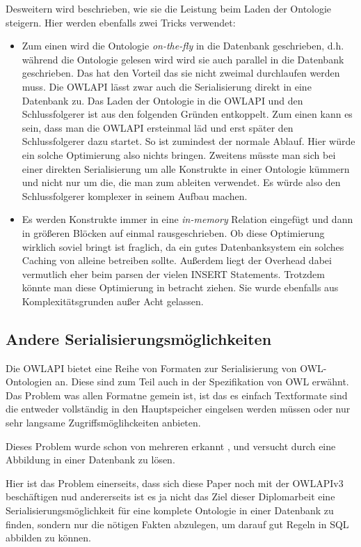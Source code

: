 Desweitern wird beschrieben, wie sie die Leistung beim Laden der Ontologie steigern. Hier werden ebenfalls zwei Tricks verwendet:
\begin{itemize}
  \item Zum einen wird die Ontologie \emph{on-the-fly} in die Datenbank geschrieben, d.h. während die Ontologie gelesen wird wird sie auch parallel in die Datenbank geschrieben. Das hat den Vorteil das sie nicht zweimal durchlaufen werden muss. Die OWLAPI lässt zwar auch die Serialisierung direkt in eine Datenbank zu. Das Laden der Ontologie in die OWLAPI und den Schlussfolgerer ist aus den folgenden Gründen entkoppelt. Zum einen kann es sein, dass man die OWLAPI ersteinmal läd und erst später den Schlussfolgerer dazu startet. So ist zumindest der normale Ablauf. Hier würde ein solche Optimierung also nichts bringen. Zweitens müsste man sich bei einer direkten Serialisierung um alle Konstrukte in einer Ontologie kümmern und nicht nur um die, die man zum ableiten verwendet. Es würde also den Schlussfolgerer komplexer in seinem Aufbau machen.
  \item Es werden Konstrukte immer in eine \emph{in-memory} Relation eingefügt und dann in größeren Blöcken auf einmal rausgeschrieben. Ob diese Optimierung wirklich soviel bringt ist fraglich, da ein gutes Datenbanksystem ein solches Caching von alleine betreiben sollte. Außerdem liegt der Overhead dabei vermutlich eher beim parsen der vielen INSERT Statements. Trotzdem könnte man diese Optimierung in betracht ziehen. Sie wurde ebenfalls aus Komplexitätsgrunden außer Acht gelassen.
\end{itemize}

\subsection{Andere Serialisierungsmöglichkeiten}
Die OWLAPI bietet eine Reihe von Formaten zur Serialisierung von OWL-Ontologien an. Diese sind zum Teil auch in der Spezifikation von OWL erwähnt. Das Problem was allen Formatne gemein ist, ist das es einfach Textformate sind die entweder vollständig in den Hauptspeicher eingelsen werden müssen oder nur sehr langsame Zugriffsmöglihckeiten anbieten.

Dieses Problem wurde schon von mehreren erkannt \cite{Kleb2009ProtegeDB}, \cite{Kleb2009OWLDB} und versucht durch eine Abbildung in einer Datenbank zu lösen.

Hier ist das Problem einerseits, dass sich diese Paper noch mit der OWLAPIv3 beschäftigen nud andererseits ist es ja nicht das Ziel dieser Diplomarbeit  eine Serialisierungsmöglichkeit für eine komplete Ontologie in einer Datenbank zu finden, sondern nur die nötigen Fakten abzulegen, um darauf gut Regeln in SQL abbilden zu können.